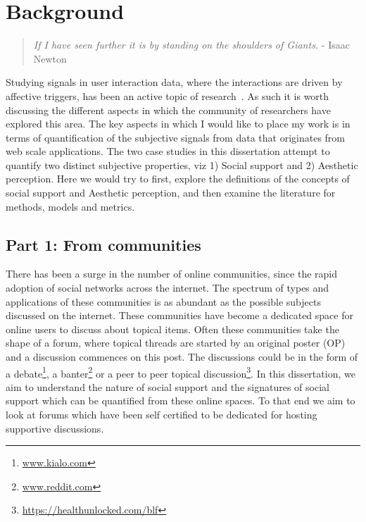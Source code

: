 \chapter{Background}  %
\label{chap:background}

\begin{quote}
\textsl{If I have seen further it is by standing on the shoulders of Giants.} - Isaac Newton
\end{quote}

Studying signals in user interaction data, where the interactions are  driven by affective triggers, has been an active topic of research~\cite{picard2003affective,pantic2007human,cambria2012sentic,adibuzzaman2013situ}. 
As such it is worth discussing the different aspects in which the community of researchers have explored this area. The key aspects in which I would like to place my work is in terms of quantification of the subjective signals from data that originates from web scale applications. 
The two case studies in this dissertation attempt to quantify two distinct subjective properties, viz 1) Social support and 2) Aesthetic perception.
Here we would try to first, explore the definitions of the concepts of social support and Aesthetic perception, and then examine the literature for methods, models and metrics.

\section{Part 1: From communities}
There has been a surge in the number of online communities, since the rapid adoption of social networks across the internet. The spectrum of types and applications of these communities is as abundant as the possible subjects discussed on the internet. 
These communities have become a dedicated space for online users to discuss about topical items. Often these communities take the shape of a forum, where topical threads are started by an original poster (OP) and a discussion commences on this post. The discussions could be in the form of a debate\footnote{\url{www.kialo.com}}, a banter\footnote{\url{www.reddit.com}} or a peer to peer topical discussion\footnote{\url{https://healthunlocked.com/blf}}. In this dissertation, we aim to understand the nature of social support and the signatures of social support which can be quantified from these online spaces. To that end we aim to look at forums which have been self certified to be dedicated for hosting supportive discussions.

